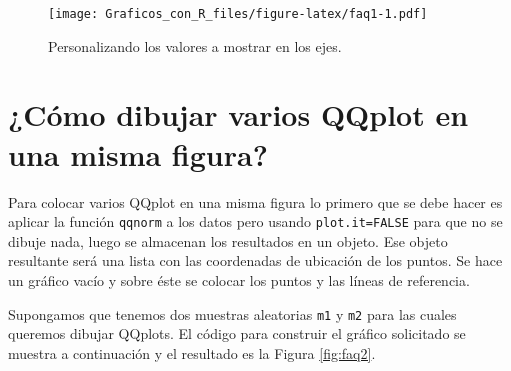 \documentclass[10pt,]{krantz}
\begin{document}
\begin{figure}
\centering
\texttt{[image: Graficos\_con\_R\_files/figure-latex/faq1-1.pdf]}
\caption{\label{fig:faq1}Personalizando los valores a mostrar en los ejes.}
\end{figure}

\section{¿Cómo dibujar varios QQplot en una misma
figura?}\label{como-dibujar-varios-qqplot-en-una-misma-figura}

Para colocar varios QQplot en una misma figura lo primero que se debe
hacer es aplicar la función \texttt{qqnorm} a los datos pero usando
\texttt{plot.it=FALSE} para que no se dibuje nada, luego se almacenan
los resultados en un objeto. Ese objeto resultante será una lista con
las coordenadas de ubicación de los puntos. Se hace un gráfico vacío y
sobre éste se colocar los puntos y las líneas de referencia.

Supongamos que tenemos dos muestras aleatorias \texttt{m1} y \texttt{m2}
para las cuales queremos dibujar QQplots. El código para construir el
gráfico solicitado se muestra a continuación y el resultado es la Figura
\ref{fig:faq2}.
\end{document}
